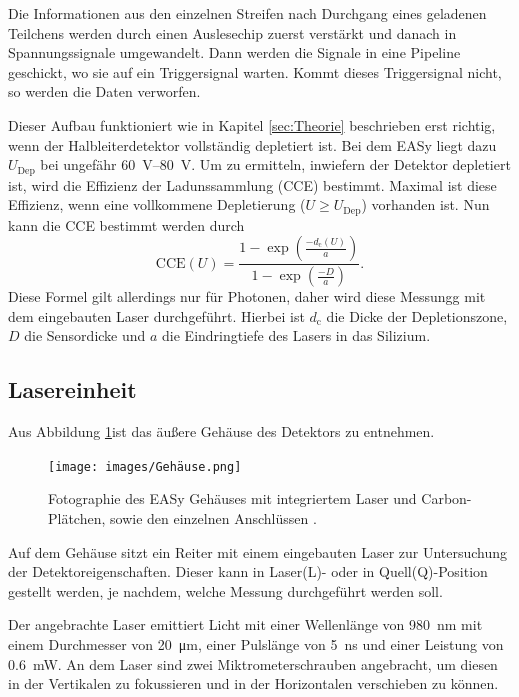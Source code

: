 Die Informationen aus den einzelnen Streifen nach Durchgang eines geladenen
Teilchens werden durch einen Auslesechip zuerst verstärkt und danach in
Spannungssignale umgewandelt. Dann werden die Signale in eine Pipeline geschickt,
wo sie auf ein Triggersignal warten. Kommt dieses Triggersignal nicht, so werden
die Daten verworfen.

Dieser Aufbau funktioniert wie in Kapitel \ref{sec:Theorie} beschrieben
erst richtig, wenn der Halbleiterdetektor vollständig depletiert ist. Bei dem
EASy liegt dazu $U_\text{Dep}$ bei ungefähr \SIrange{60}{80}{\volt}. Um zu
ermitteln, inwiefern der Detektor depletiert ist, wird die Effizienz der
Ladunssammlung (CCE) bestimmt. Maximal ist diese Effizienz, wenn eine vollkommene
Depletierung ($U \ge U_\text{Dep}$) vorhanden ist. Nun kann die CCE bestimmt werden
durch
\begin{equation}
  \text{CCE}(U) = \frac{1 - \exp\left(\frac{-d_\text{c}(U)}{a}\right)}{1 - \exp\left(\frac{-D}{a}\right)}.
  \label{eqn:CCEL}
\end{equation}
Diese Formel gilt allerdings nur für Photonen, daher wird diese Messungg mit dem
eingebauten Laser durchgeführt.
Hierbei ist $d_\text{c}$ die Dicke der Depletionszone, $D$ die Sensordicke und
$a$ die Eindringtiefe des Lasers in das Silizium.

\FloatBarrier
\subsection{Lasereinheit}
\label{sec:Lasereinheit}
Aus Abbildung \ref{fig:Gehäuse}ist das äußere Gehäuse des Detektors zu entnehmen.
\begin{figure}[htb]
  \centering
  \texttt{[image: images/Gehäuse.png]}
  \caption{Fotographie des EASy Gehäuses mit integriertem Laser und Carbon-Plätchen,
  sowie den einzelnen Anschlüssen \cite{anleitung}.}
  \label{fig:Gehäuse}
\end{figure}
Auf dem Gehäuse sitzt ein Reiter mit einem eingebauten Laser zur Untersuchung der
Detektoreigenschaften. Dieser kann in Laser(L)- oder in Quell(Q)-Position
gestellt werden, je nachdem, welche Messung durchgeführt werden soll.

Der angebrachte Laser emittiert Licht mit einer Wellenlänge von \SI{980}{\nano\meter}
mit einem Durchmesser von \SI{20}{\micro\meter}, einer Pulslänge von
\SI{5}{\nano\second} und einer Leistung von \SI{0.6}{\milli\watt}.
An dem Laser sind zwei Miktrometerschrauben angebracht, um diesen in der Vertikalen
zu fokussieren und in der Horizontalen verschieben zu können.

